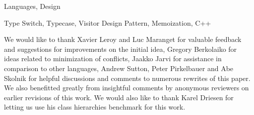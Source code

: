 \documentclass[preprint,10pt]{sigplanconf}
\begin{document}
\begin{abstract}
%
\end{abstract}


\terms
Languages, Design

\keywords
Type Switch, Typecase, Visitor Design Pattern, Memoization, C++







%

%









\acks

We would like to thank Xavier Leroy and Luc Maranget for valuable feedback and 
suggestions for improvements on the initial idea, Gregory Berkolaiko for ideas 
related to minimization of conflicts, Jaakko Jarvi for assistance in comparison 
to other languages, Andrew Sutton, Peter Pirkelbauer and Abe Skolnik for helpful 
discussions and comments to numerous rewrites of this paper. 
We also benefitted greatly from insightful comments by anonymous reviewers on 
earlier revisions of this work. We would also like to thank Karel Driesen for 
letting us use his class hierarchies benchmark for this work.



\end{document}
